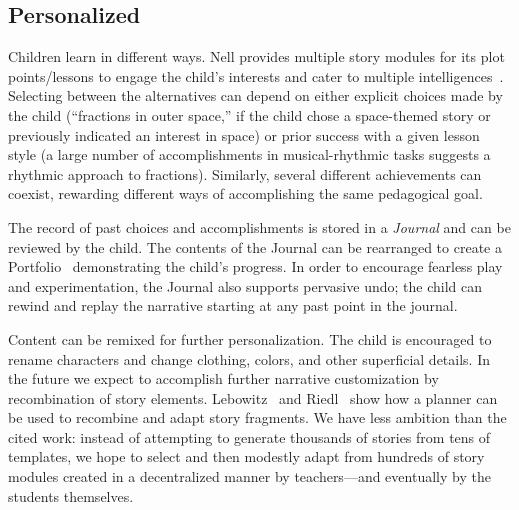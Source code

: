 \documentclass[preprint]{sig-alternate}
\begin{document}

\subsection{Personalized}


Children learn in different ways.  Nell provides multiple
story modules for its plot points/lessons to engage the child's
interests and cater to multiple intelligences~\cite{gardner:mi}.
Selecting between the alternatives can depend on either explicit
choices made by the child (``fractions in outer space,'' if the child
chose a space-themed story or previously indicated an interest in space)
or prior success with a given
lesson style (a large number of accomplishments in musical-rhythmic
tasks suggests a rhythmic approach to fractions).  Similarly, several
different achievements can coexist, rewarding different ways of
accomplishing the same pedagogical goal.

The record of past choices and accomplishments is stored in a
\textit{Journal} and can be reviewed by the child.  The contents of the
Journal can be rearranged to create a Portfolio~\cite{stefanakis:portfolios}
demonstrating the child's progress.
In order to encourage fearless play and experimentation, the Journal
also supports pervasive undo; the child can rewind and replay the
narrative starting at any past point in the journal.

Content can be remixed for further personalization.
The child is encouraged to rename characters and change clothing,
colors, and other superficial details.  In the future
we expect to accomplish further narrative customization by
recombination of story elements.
Lebowitz~\cite{lebowitz:universe85} and Riedl~\cite{riedl:planning}
show how a planner can be used to recombine and adapt story fragments.
We have less ambition than the cited work: instead of
attempting to generate thousands of stories from tens of templates, we
hope to select and then modestly adapt from hundreds of story
modules created in a decentralized manner by teachers---and eventually
by the students themselves.
\end{document}
